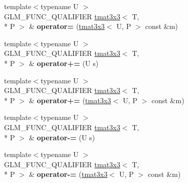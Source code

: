 \begin{DoxyCompactItemize}
\item 
\hypertarget{structglm_1_1detail_1_1tmat3x3_a460c6e70ac10a60f30d800146e65f1ba}{{\footnotesize template$<$typename U $>$ }\\G\-L\-M\-\_\-\-F\-U\-N\-C\-\_\-\-Q\-U\-A\-L\-I\-F\-I\-E\-R \hyperlink{structglm_1_1detail_1_1tmat3x3}{tmat3x3}$<$ T, \\*
P $>$ \& {\bfseries operator=} (\hyperlink{structglm_1_1detail_1_1tmat3x3}{tmat3x3}$<$ U, P $>$ const \&m)}\label{structglm_1_1detail_1_1tmat3x3_a460c6e70ac10a60f30d800146e65f1ba}

\item 
\hypertarget{structglm_1_1detail_1_1tmat3x3_a5e6d2e421fbd009d27051c5bc8a6c487}{{\footnotesize template$<$typename U $>$ }\\G\-L\-M\-\_\-\-F\-U\-N\-C\-\_\-\-Q\-U\-A\-L\-I\-F\-I\-E\-R \hyperlink{structglm_1_1detail_1_1tmat3x3}{tmat3x3}$<$ T, \\*
P $>$ \& {\bfseries operator+=} (U s)}\label{structglm_1_1detail_1_1tmat3x3_a5e6d2e421fbd009d27051c5bc8a6c487}

\item 
\hypertarget{structglm_1_1detail_1_1tmat3x3_ac54fab49afb79333e8471a7986fe97b0}{{\footnotesize template$<$typename U $>$ }\\G\-L\-M\-\_\-\-F\-U\-N\-C\-\_\-\-Q\-U\-A\-L\-I\-F\-I\-E\-R \hyperlink{structglm_1_1detail_1_1tmat3x3}{tmat3x3}$<$ T, \\*
P $>$ \& {\bfseries operator+=} (\hyperlink{structglm_1_1detail_1_1tmat3x3}{tmat3x3}$<$ U, P $>$ const \&m)}\label{structglm_1_1detail_1_1tmat3x3_ac54fab49afb79333e8471a7986fe97b0}

\item 
\hypertarget{structglm_1_1detail_1_1tmat3x3_a8571cd3a69ca0d1f25d17a724e730c07}{{\footnotesize template$<$typename U $>$ }\\G\-L\-M\-\_\-\-F\-U\-N\-C\-\_\-\-Q\-U\-A\-L\-I\-F\-I\-E\-R \hyperlink{structglm_1_1detail_1_1tmat3x3}{tmat3x3}$<$ T, \\*
P $>$ \& {\bfseries operator-\/=} (U s)}\label{structglm_1_1detail_1_1tmat3x3_a8571cd3a69ca0d1f25d17a724e730c07}

\item 
\hypertarget{structglm_1_1detail_1_1tmat3x3_aee1a83177bbf6078a9d2ef4f753dccb4}{{\footnotesize template$<$typename U $>$ }\\G\-L\-M\-\_\-\-F\-U\-N\-C\-\_\-\-Q\-U\-A\-L\-I\-F\-I\-E\-R \hyperlink{structglm_1_1detail_1_1tmat3x3}{tmat3x3}$<$ T, \\*
P $>$ \& {\bfseries operator-\/=} (\hyperlink{structglm_1_1detail_1_1tmat3x3}{tmat3x3}$<$ U, P $>$ const \&m)}\label{structglm_1_1detail_1_1tmat3x3_aee1a83177bbf6078a9d2ef4f753dccb4}


\end{DoxyCompactItemize}
